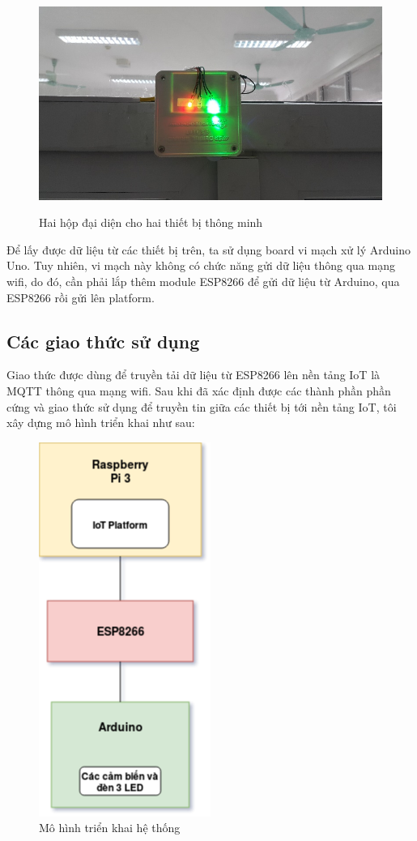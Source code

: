 \begin{figure}
	\center
	\includegraphics[scale=1]{image/hop_2}
	\label{fig:2hop}
	\caption{Hai hộp đại diện cho hai thiết bị thông minh}
\end{figure}

Để lấy được dữ liệu từ các thiết bị trên, ta sử dụng board vi mạch xử lý Arduino Uno. Tuy nhiên, vi mạch này không có chức năng gửi dữ liệu thông qua mạng wifi, do đó, cần phải lắp thêm module ESP8266 để gửi dữ liệu từ Arduino, qua ESP8266 rồi gửi lên platform.

\subsection{Các giao thức sử dụng}
Giao thức được dùng để truyền tải dữ liệu từ ESP8266 lên nền tảng IoT là MQTT thông qua mạng wifi. Sau khi đã xác định được các thành phần phần cứng và giao thức sử dụng để truyền tin giữa các thiết bị tới nền tảng IoT, tôi xây dựng mô hình triển khai như sau: \\

\clearpage
\begin{figure}[h!]
	\center
	\includegraphics[scale=0.6]{image/mo_hinh_trien_khai_phan_cung}
	\caption{Mô hình triển khai hệ thống}
	
	\label{fig:mo_hinh_trien_khai_phan_cung}
\end{figure}


